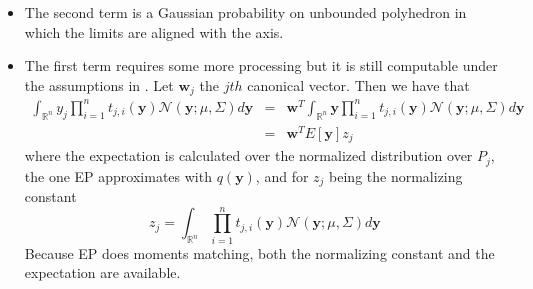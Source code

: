 \documentclass{article} %
\newcommand{\bw}{\textbf{w}}
\newcommand{\by}{\textbf{y}}
\newcommand{\N}{\mathcal{N}}
\newcommand{\IR}{\mathbb{R}}
\begin{document}
\begin{itemize}
\item The second term is a Gaussian probability on unbounded polyhedron in which the limits are aligned with the axis.  
\item The first term requires some more processing but it is still computable under the assumptions in \cite{Cunningham*Hennig*Lacoste-Julien_2011}. Let $\bw_j$ the $jth$ canonical vector. Then we have that
\begin{eqnarray}
\int_{\IR^n} y_j \prod_{i=1}^n t_{j,i}(\by) \N(\by; \mu, \Sigma) d \by & = & \bw^T  \int_{\IR^n} \by \prod_{i=1}^n t_{j,i}(\by) \N(\by; \mu, \Sigma) d \by \\
& = & \bw^T E[\by] z_j
\end{eqnarray}
where the expectation is calculated over the normalized distribution over $P_j$, the one EP approximates with $q(\by)$, and for $z_j$ being the normalizing constant 
  $$z_j= \int_{\IR^n} \prod_{i=1}^n t_{j,i}(\by) \N(\by; \mu, \Sigma) d \by$$  
Because EP does moments matching, both the normalizing constant and the expectation are available.
\end{itemize}



\end{document}

